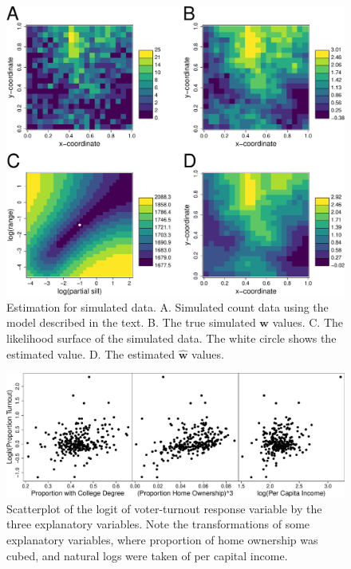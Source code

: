 \documentclass[12pt, titlepage]{article}
\begin{document}
\begin{figure}[H]
  \begin{center}
	    \includegraphics[width=.95\linewidth]{figures/pois_likelihood_estimation}
  \end{center}
  \caption{Estimation for simulated data. A. Simulated count data using the model described in the text.  B. The true simulated $\mathbf{w}$ values. C. The likelihood surface of the simulated data.  The white circle shows the estimated value.  D. The estimated $\hat{\mathbf{w}}$ values. \label{Fig:sglm_likelihood_estimation}}
\end{figure}

\begin{figure}[H]
  \begin{center}
	    \includegraphics[width=.95\linewidth]{figures/TexTurn_scatter}
  \end{center}
  \caption{Scatterplot of the logit of voter-turnout response variable by the three explanatory variables.  Note the transformations of some explanatory variables, where proportion of home ownership was cubed, and natural logs were taken of per capital income.  \label{Fig:TexTurn_scatter}}
\end{figure}
\end{document}
